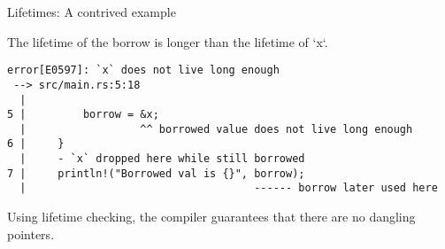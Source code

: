 \begin{frame}[fragile]{Lifetimes: A contrived example}

The lifetime of the borrow is longer than the lifetime of `x`.

\begin{verbatim}
error[E0597]: `x` does not live long enough
 --> src/main.rs:5:18
  |
5 |         borrow = &x;
  |                  ^^ borrowed value does not live long enough
6 |     }
  |     - `x` dropped here while still borrowed
7 |     println!("Borrowed val is {}", borrow);
  |                                    ------ borrow later used here
\end{verbatim}

Using lifetime checking, the compiler guarantees that there are no dangling
pointers.

\end{frame}
